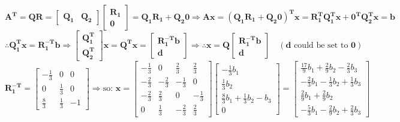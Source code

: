 \documentclass[english,onecolumn]{IEEEtran}
\begin{document}
\begin{enumerate}
    $$\mathbf{A^T = Q R = }  
    \begin{bmatrix}  \mathbf{Q_1} & \mathbf{Q_2}  \end{bmatrix}  
    \begin{bmatrix}  \mathbf{R_1} \\ \mathbf{0}  \end{bmatrix} = \mathbf{Q_1 R_1 + Q_2 0} \Rightarrow
    \mathbf{A x = (Q_1 R_1 + Q_2 0)^T x = R_1^T Q_1^T x + 0^T Q_2^T x = b  }
    $$
    $$ \therefore \mathbf{Q_1^T x = R_1^{-T} b} \Rightarrow 
    \begin{bmatrix}  \mathbf{Q_1^T} \\ \mathbf{Q_2^T}  \end{bmatrix} 
    \mathbf{x = Q^T x} = \begin{bmatrix}  \mathbf{R_1^{-T} b} \\ \mathbf{d}  \end{bmatrix} \Rightarrow
    \therefore \mathbf{x} = \mathbf{Q}  \begin{bmatrix}  \mathbf{R_1^{-T} b} \\ \mathbf{d}  \end{bmatrix}
    \quad (\mathbf{d} \text{ could be set to } \mathbf{0})
    $$
    $$
    \mathbf{R_1^{-T}} = 
    \begin{bmatrix}
        -\frac{1}{3} & 0 & 0  \\
        0 & \frac{1}{3} & 0 \\
        \frac{8}{3} & \frac{1}{3} & -1 
    \end{bmatrix} \Rightarrow \text{so: }
    \mathbf{x} = 
    \begin{bmatrix}
        -\frac{1}{3} & 0 & \frac{2}{3} & \frac{2}{3} \\
        -\frac{2}{3} & -\frac{2}{3} & -\frac{1}{3} & 0 \\
        -\frac{2}{3} & \frac{2}{3} & 0 & -\frac{1}{3} \\
        0 & \frac{1}{3} & -\frac{2}{3} & \frac{2}{3}
    \end{bmatrix}
    \begin{bmatrix}  
    -\frac{1}{3} b_1 \\ 
    \frac{1}{3} b_2 \\
    \frac{8}{3} b_1 + \frac{1}{3} b_2 - b_3\\
    0
    \end{bmatrix} = 
    \begin{bmatrix}  
    \frac{17}{9} b_1 + \frac{2}{9} b_2 -\frac{2}{3} b_3 \\ 
    -\frac{2}{3} b_1 - \frac{1}{3} b_2 + \frac{1}{3} b_3 \\
    \frac{2}{9} b_1 + \frac{2}{9} b_2 \\
    -\frac{5}{3} b_1 - \frac{2}{9} b_2 + \frac{2}{3} b_3
    \end{bmatrix}
    $$
    
\end{enumerate}
\end{document}
